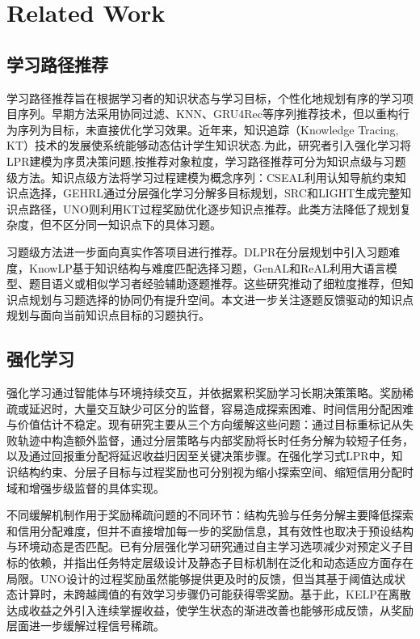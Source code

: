 \documentclass[11pt,a4paper]{article}
\begin{document}
\section{Related Work}
\subsection{学习路径推荐}
学习路径推荐旨在根据学习者的知识状态与学习目标，个性化地规划有序的学习项目序列\cite{nabizadeh2020learning}。早期方法采用协同过滤、KNN、GRU4Rec等序列推荐技术\cite{cover1967nearest,hidasi2015session}，但以重构行为序列为目标，未直接优化学习效果。近年来，知识追踪（Knowledge Tracing, KT）技术\cite{piech2015deep,shen2022assessing,liu2025deep}的发展使系统能够动态估计学生知识状态\cite{kubotani2021rltutor}.为此，研究者引入强化学习将LPR建模为序贯决策问题,按推荐对象粒度，学习路径推荐可分为知识点级与习题级方法。知识点级方法将学习过程建模为概念序列：CSEAL利用认知导航约束知识点选择\cite{liu2019exploiting}，GEHRL通过分层强化学习分解多目标规划\cite{li2023graph}，SRC和LIGHT生成完整知识点路径\cite{chen2023set,yu2025light}，UNO则利用KT过程奖励优化逐步知识点推荐\cite{peng2026uno}。此类方法降低了规划复杂度，但不区分同一知识点下的具体习题。

习题级方法进一步面向真实作答项目进行推荐。DLPR在分层规划中引入习题难度\cite{zhang2024item}，KnowLP基于知识结构与难度匹配选择习题\cite{cheng2026graphrag}，GenAL和ReAL利用大语言模型、题目语义或相似学习者经验辅助逐题推荐\cite{lv2025genal,lv2025real}。这些研究推动了细粒度推荐，但知识点规划与习题选择的协同仍有提升空间。本文进一步关注逐题反馈驱动的知识点规划与面向当前知识点目标的习题执行。
\subsection{强化学习}
强化学习通过智能体与环境持续交互，并依据累积奖励学习长期决策策略。奖励稀疏或延迟时，大量交互缺少可区分的监督，容易造成探索困难、时间信用分配困难与价值估计不稳定。现有研究主要从三个方向缓解这些问题：通过目标重标记从失败轨迹中构造额外监督\cite{andrychowicz2017hindsight}，通过分层策略与内部奖励将长时任务分解为较短子任务\cite{kulkarni2016hierarchical}，以及通过回报重分配将延迟收益归因至关键决策步骤\cite{arjona2019rudder}。在强化学习式LPR中，知识结构约束、分层子目标与过程奖励也可分别视为缩小探索空间、缩短信用分配时域和增强步级监督的具体实现\cite{liu2019exploiting,li2023graph,zhang2024item,peng2026uno}。

不同缓解机制作用于奖励稀疏问题的不同环节：结构先验与任务分解主要降低探索和信用分配难度，但并不直接增加每一步的奖励信息，其有效性也取决于预设结构与环境动态是否匹配。已有分层强化学习研究通过自主学习选项减少对预定义子目标的依赖，并指出任务特定层级设计及静态子目标机制在泛化和动态适应方面存在局限\cite{bacon2017optioncritic,nachum2018dataefficient,gurtler2021timed}。UNO设计的过程奖励虽然能够提供更及时的反馈，但当其基于阈值达成状态计算时，未跨越阈值的有效学习步骤仍可能获得零奖励。基于此，KELP在离散达成收益之外引入连续掌握收益，使学生状态的渐进改善也能够形成反馈，从奖励层面进一步缓解过程信号稀疏。
\end{document}
